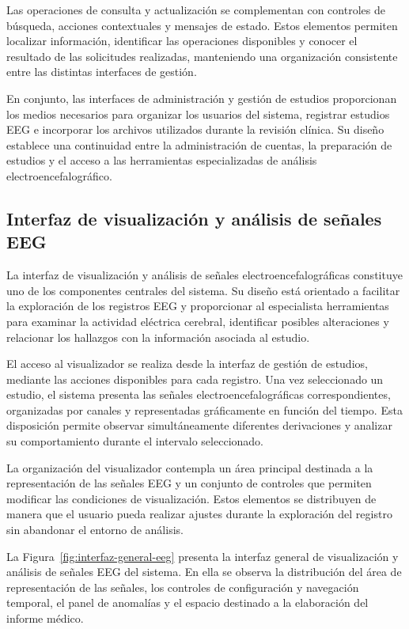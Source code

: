 Las operaciones de consulta y actualización se complementan
con controles de búsqueda, acciones contextuales y mensajes
de estado. Estos elementos permiten localizar información,
identificar las operaciones disponibles y conocer el resultado
de las solicitudes realizadas, manteniendo una organización
consistente entre las distintas interfaces de gestión.

En conjunto, las interfaces de administración y gestión de
estudios proporcionan los medios necesarios para organizar
los usuarios del sistema, registrar estudios EEG e incorporar
los archivos utilizados durante la revisión clínica. Su
diseño establece una continuidad entre la administración
de cuentas, la preparación de estudios y el acceso a las
herramientas especializadas de análisis electroencefalográfico.


\subsection{Interfaz de visualización y análisis de señales EEG}

La interfaz de visualización y análisis de señales electroencefalográficas constituye uno de los componentes centrales del sistema. Su diseño está orientado a facilitar la exploración de los registros EEG y proporcionar al especialista herramientas para examinar la actividad eléctrica cerebral, identificar posibles alteraciones y relacionar los hallazgos con la información asociada al estudio.

El acceso al visualizador se realiza desde la interfaz de gestión de estudios, mediante las acciones disponibles para cada registro. Una vez seleccionado un estudio, el sistema presenta las señales electroencefalográficas correspondientes, organizadas por canales y representadas gráficamente en función del tiempo. Esta disposición permite observar simultáneamente diferentes derivaciones y analizar su comportamiento durante el intervalo seleccionado.

La organización del visualizador contempla un área principal destinada a la representación de las señales EEG y un conjunto de controles que permiten modificar las condiciones de visualización. Estos elementos se distribuyen de manera que el usuario pueda realizar ajustes durante la exploración del registro sin abandonar el entorno de análisis.

La Figura~\ref{fig:interfaz-general-eeg} presenta la interfaz general de visualización y análisis de señales EEG del sistema. En ella se observa la distribución del área de representación de las señales, los controles de configuración y navegación temporal, el panel de anomalías y el espacio destinado a la elaboración del informe médico.

